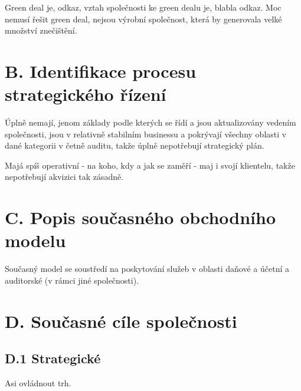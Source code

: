 Green deal je, odkaz, vztah společnosti ke green dealu je, blabla odkaz. Moc nemusí řešit green deal, nejsou výrobní společnost, která by generovala velké množství znečištění.

\section*{B. Identifikace procesu strategického řízení}
\label{sec:Identifikace procesu strategickeho rizeni}

Úplně nemají, jenom základy podle kterých se řídí a jsou aktualizovány vedením společnosti, jsou v relativně stabilním businessu a pokrývají všechny oblasti v dané kategorii v četně auditu, takže úplně nepotřebují strategický plán.

Majá spíš operativní - na koho, kdy a jak se zaměří - maj i svojí klientelu, takže nepotřebují akvizici tak zásadně.

\section*{C. Popis současného obchodního modelu}
\label{sec:Popis soucasneho obchodniho modelu}

Současný model se soustředí na poskytování služeb v oblasti daňové a účetní a auditorské (v rámci jiné společnosti).

\newpage


\section*{D. Současné cíle společnosti}
\label{sec:Soucasne cile spolecnosti}

\subsection*{D.1 Strategické}
\label{sec:Strategicke}

Asi ovládnout trh.

